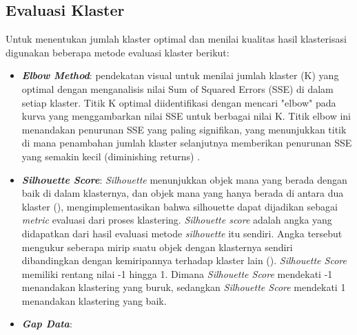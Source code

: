 \subsection{Evaluasi Klaster}
Untuk menentukan jumlah klaster optimal dan menilai kualitas hasil klasterisasi digunakan beberapa metode evaluasi klaster berikut:
\begin{itemize}
     \item \textbf{\textit{Elbow Method}}: pendekatan visual untuk menilai jumlah klaster (K) yang optimal dengan menganalisis nilai Sum of Squared Errors (SSE) di dalam setiap klaster. Titik K optimal diidentifikasi dengan mencari "elbow" pada kurva yang menggambarkan nilai SSE untuk berbagai nilai K. Titik elbow ini menandakan penurunan SSE yang paling signifikan, yang menunjukkan titik di mana penambahan jumlah klaster selanjutnya memberikan penurunan SSE yang semakin kecil (diminishing returns) \parencite{Sugar2003,Umargono2020}.
    \item \textbf{\textit{Silhouette Score}}: \textit{Silhouette} menunjukkan objek mana yang berada dengan baik di dalam klasternya, dan objek mana yang hanya berada di antara dua klaster (\cite{Rousseeuw1987}), mengimplementasikan bahwa silhouette dapat dijadikan sebagai \textit{metric} evaluasi dari proses klastering. \textit{Silhouette score} adalah angka yang didapatkan dari hasil evaluasi metode \textit{silhouette} itu sendiri. Angka tersebut mengukur seberapa mirip suatu objek dengan klasternya sendiri dibandingkan dengan kemiripannya terhadap klaster lain (\cite{Januzaj2023}). \textit{Silhouette Score} memiliki rentang nilai -1 hingga 1. Dimana \textit{Silhouette Score} mendekati -1 menandakan klastering yang buruk, sedangkan \textit{Silhouette Score} mendekati 1 menandakan klastering yang baik.
    \item \textbf{\textit{Gap Data}}:
\end{itemize}
